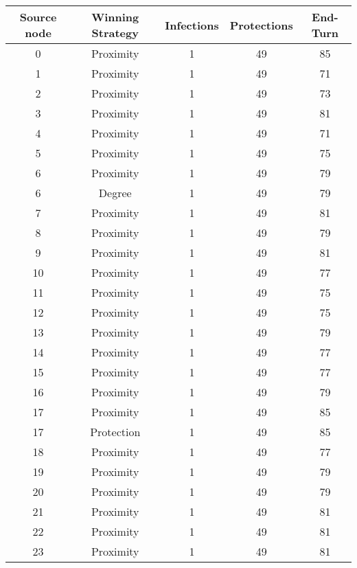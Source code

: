 \documentclass[results.tex]{subfiles}
\begin{document}
\begin{center}
  \begin{tabular}{| c || c | c | c | c |}
    \hline
    {\bfseries Source node} & {\bfseries Winning Strategy} & {\bfseries Infections} & {\bfseries Protections} & {\bfseries End-Turn} \\  %
    \hline\hline
    0 & Proximity & 1 & 49 & 85 \\ 
    \hline
    1 & Proximity & 1 & 49 & 71 \\ 
    \hline
    2 & Proximity & 1 & 49 & 73 \\ 
    \hline
    3 & Proximity & 1 & 49 & 81 \\ 
    \hline
    4 & Proximity & 1 & 49 & 71 \\ 
    \hline
    5 & Proximity & 1 & 49 & 75 \\ 
    \hline
    6 & Proximity & 1 & 49 & 79 \\ 
    \hline
    6 & Degree & 1 & 49 & 79 \\ 
    \hline
    7 & Proximity & 1 & 49 & 81 \\ 
    \hline
    8 & Proximity & 1 & 49 & 79 \\ 
    \hline
    9 & Proximity & 1 & 49 & 81 \\ 
    \hline
    10 & Proximity & 1 & 49 & 77 \\ 
    \hline
    11 & Proximity & 1 & 49 & 75 \\ 
    \hline
    12 & Proximity & 1 & 49 & 75 \\ 
    \hline
    13 & Proximity & 1 & 49 & 79 \\ 
    \hline
    14 & Proximity & 1 & 49 & 77 \\ 
    \hline
    15 & Proximity & 1 & 49 & 77 \\ 
    \hline
    16 & Proximity & 1 & 49 & 79 \\ 
    \hline
    17 & Proximity & 1 & 49 & 85 \\ 
    \hline
    17 & Protection & 1 & 49 & 85 \\ 
    \hline
    18 & Proximity & 1 & 49 & 77 \\ 
    \hline
    19 & Proximity & 1 & 49 & 79 \\ 
    \hline
    20 & Proximity & 1 & 49 & 79 \\ 
    \hline
    21 & Proximity & 1 & 49 & 81 \\ 
    \hline
    22 & Proximity & 1 & 49 & 81 \\ 
    \hline
    23 & Proximity & 1 & 49 & 81 \\ 

\end{tabular}
\end{center}
\end{document}
